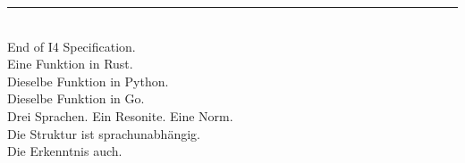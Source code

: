 \documentclass[11pt,a4paper]{article}
\begin{document}
\vfill
\begin{center}
\color{isls-gray}\rule{0.5\textwidth}{0.4pt}\\[0.5em]
{\small End of I4 Specification.\\[0.3em]
Eine Funktion in Rust.\\
Dieselbe Funktion in Python.\\
Dieselbe Funktion in Go.\\
Drei Sprachen. Ein Resonite. Eine Norm.\\
Die Struktur ist sprachunabh\"angig.\\
Die Erkenntnis auch.}
\end{center}
\end{document}
